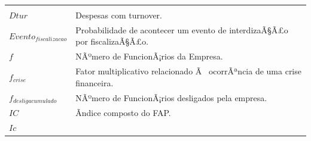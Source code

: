 \documentclass[]{article}
\begin{document}
\begin{longtable}[]{@{}ll@{}}
\begin{minipage}[t]{0.87\columnwidth}
\end{minipage}\tabularnewline
\begin{minipage}[t]{0.07\columnwidth}\raggedright\strut
\(Dtur\)\strut
\end{minipage} & \begin{minipage}[t]{0.87\columnwidth}\raggedright\strut
Despesas com turnover.\strut
\end{minipage}\tabularnewline
\begin{minipage}[t]{0.07\columnwidth}\raggedright\strut
\(Evento_{fiscalizacao}\)\strut
\end{minipage} & \begin{minipage}[t]{0.87\columnwidth}\raggedright\strut
Probabilidade de acontecer um evento de interdizaÃ§Ã£o por
fiscalizaÃ§Ã£o.\strut
\end{minipage}\tabularnewline
\begin{minipage}[t]{0.07\columnwidth}\raggedright\strut
\(f\)\strut
\end{minipage} & \begin{minipage}[t]{0.87\columnwidth}\raggedright\strut
NÃºmero de FuncionÃ¡rios da Empresa.\strut
\end{minipage}\tabularnewline
\begin{minipage}[t]{0.07\columnwidth}\raggedright\strut
\(f_{crise}\)\strut
\end{minipage} & \begin{minipage}[t]{0.87\columnwidth}\raggedright\strut
Fator multiplicativo relacionado Ã~ ocorrÃªncia de uma crise
financeira.\strut
\end{minipage}\tabularnewline
\begin{minipage}[t]{0.07\columnwidth}\raggedright\strut
\(f_{desligacumulado}\)\strut
\end{minipage} & \begin{minipage}[t]{0.87\columnwidth}\raggedright\strut
NÃºmero de FuncionÃ¡rios desligados pela empresa.\strut
\end{minipage}\tabularnewline
\begin{minipage}[t]{0.07\columnwidth}\raggedright\strut
\(IC\)\strut
\end{minipage} & \begin{minipage}[t]{0.87\columnwidth}\raggedright\strut
Ãndice composto do FAP.\strut
\end{minipage}\tabularnewline
\begin{minipage}[t]{0.07\columnwidth}\raggedright\strut
\(Ic\)\strut
\end{minipage} & \begin{minipage}[t]{0.87\columnwidth}\raggedright\strut

\end{minipage}
\end{longtable}
\end{document}
